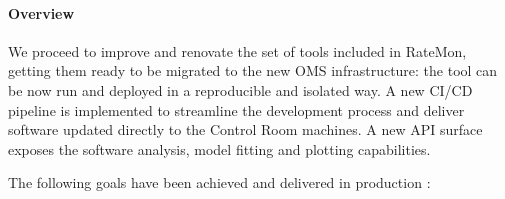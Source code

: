 \documentclass[a4, oneside, 11pt, nobib]{memoir}
\begin{document}
		\paragraph{Overview}

		We proceed to improve and renovate the set of tools included in RateMon, getting them ready to be migrated to the new OMS infrastructure: the tool can be now run and deployed in a reproducible and isolated way. A new CI/CD pipeline is implemented to streamline the development process and deliver software updated directly to the Control Room machines. A new API surface exposes the software analysis, model fitting and plotting capabilities.

		The following goals have been achieved and delivered in production \cite{VivaceRTM1} \cite{VivaceRTM2} \cite{L1TriggerOMSDevelopments} \cite{MohrmanRTM}:
\end{document}
